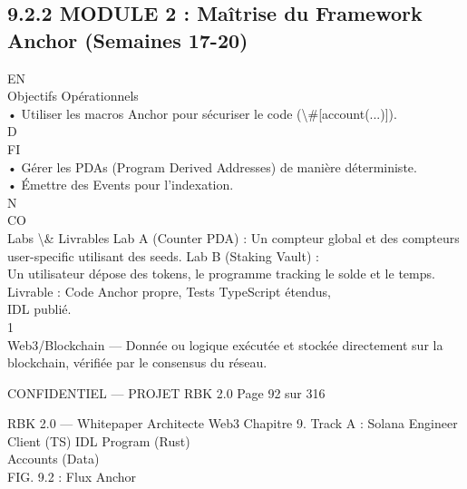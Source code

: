\subsection{9.2.2 MODULE 2 : Maîtrise du Framework Anchor (Semaines 17-20)}
\vspace{0.5em}
\vspace{0.5em}
\vspace{0.5em}
\vspace{0.5em}
EN\\
Objectifs Opérationnels\\
\vspace{0.5em}
• Utiliser les macros Anchor pour sécuriser le code (\textbackslash{}#[account(...)]).\\
\vspace{0.5em}
\vspace{0.5em}
\vspace{0.5em}
\vspace{0.5em}
D\\
FI\\
• Gérer les PDAs (Program Derived Addresses) de manière déterministe.\\
\vspace{0.5em}
• Émettre des Events pour l’indexation.\\
N\\
CO\\
Labs \textbackslash{}& Livrables Lab A (Counter PDA) : Un compteur global et des compteurs user-specific utilisant des seeds. Lab B (Staking Vault) :\\
Un utilisateur dépose des tokens, le programme tracking le solde et le temps. Livrable : Code Anchor propre, Tests TypeScript étendus,\\
IDL publié.\\
1\\
Web3/Blockchain — Donnée ou logique exécutée et stockée directement sur la blockchain, vérifiée par le consensus du réseau.\\
\vspace{0.5em}
\vspace{0.5em}
\vspace{0.5em}
\vspace{0.5em}
\begin{confidential}CONFIDENTIEL — PROJET RBK 2.0                                            Page 92 sur 316\end{confidential}
RBK 2.0 — Whitepaper Architecte Web3                                                                                 Chapitre 9. Track A : Solana Engineer\\
\vspace{0.5em}
\vspace{0.5em}
Client (TS)          IDL        Program (Rust)\\
\vspace{0.5em}
\vspace{0.5em}
\vspace{0.5em}
Accounts (Data)\\
\vspace{0.5em}
FIG. 9.2 : Flux Anchor\\
\vspace{0.5em}
\vspace{0.5em}
